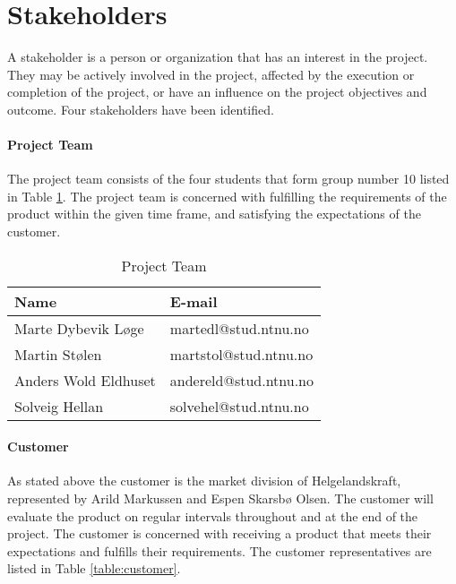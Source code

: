 \section{Stakeholders}

A stakeholder is a person or organization that has an interest in the project. They may be actively involved in the project, affected by the execution or completion of the project, or have an influence on the project objectives and outcome. Four stakeholders have been identified. \cite{stakeholder}


\paragraph{Project Team}

The project team consists of the four students that form group number 10 listed in Table \ref{table:team}. The project team is concerned with fulfilling the requirements of the product within the given time frame, and satisfying the expectations of the customer.


\begin{table}[H]
\begin{center}
    \begin{tabular}{| l | l |}
   	\hline
    \rowcolor{gray}
    {\bf Name} & {\bf E-mail} \\ \hline
    Marte Dybevik Løge & martedl@stud.ntnu.no \\ \hline
    Martin Stølen & martstol@stud.ntnu.no \\ \hline
    Anders Wold Eldhuset & andereld@stud.ntnu.no \\ \hline
    Solveig Hellan & solvehel@stud.ntnu.no \\ 
    \hline
    \end{tabular}
\end{center}

\caption{Project Team}
\label{table:team}
\end{table}

\paragraph{Customer}

As stated above the customer is the market division of Helgelandskraft, represented by Arild Markussen and Espen Skarsbø Olsen. The customer will evaluate the product on regular intervals throughout and at the end of the project. The customer is concerned with receiving a product that meets their expectations and fulfills their requirements. The customer representatives are listed in Table \ref{table:customer}.

